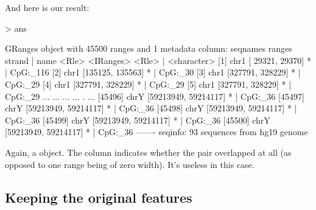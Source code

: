 \documentclass[10pt]{article}
\begin{document}
And here is our result:
\begin{Schunk}
\begin{Sinput}
> ans
\end{Sinput}
\begin{Soutput}
GRanges object with 45500 ranges and 1 metadata column:
          seqnames               ranges strand |        name
             <Rle>            <IRanges>  <Rle> | <character>
      [1]     chr1     [ 29321,  29370]      * |    CpG:_116
      [2]     chr1     [135125, 135563]      * |     CpG:_30
      [3]     chr1     [327791, 328229]      * |     CpG:_29
      [4]     chr1     [327791, 328229]      * |     CpG:_29
      [5]     chr1     [327791, 328229]      * |     CpG:_29
      ...      ...                  ...    ... .         ...
  [45496]     chrY [59213949, 59214117]      * |     CpG:_36
  [45497]     chrY [59213949, 59214117]      * |     CpG:_36
  [45498]     chrY [59213949, 59214117]      * |     CpG:_36
  [45499]     chrY [59213949, 59214117]      * |     CpG:_36
  [45500]     chrY [59213949, 59214117]      * |     CpG:_36
  -------
  seqinfo: 93 sequences from hg19 genome
\end{Soutput}
\end{Schunk}
Again, a  object. The  column indicates
whether the pair overlapped at all (as opposed to one range being of
zero width). It's useless in this case.

\subsection{Keeping the original features}
\end{document}
